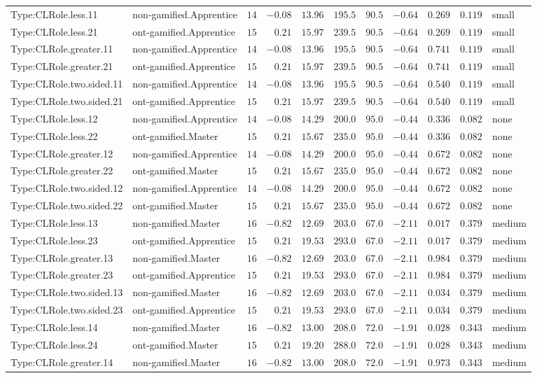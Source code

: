 \documentclass[6pt,a4paper]{article}
\begin{document}
{\begin{longtable}{llrrrrrrrrl}
Type:CLRole.less.11&non-gamified.Apprentice&$14$&$-0.08$&$13.96$&$ 195.5$&$ 90.5$&$-0.64$&$0.269$&$0.119$&small\tabularnewline
Type:CLRole.less.21&ont-gamified.Apprentice&$15$&$ 0.21$&$15.97$&$ 239.5$&$ 90.5$&$-0.64$&$0.269$&$0.119$&small\tabularnewline
Type:CLRole.greater.11&non-gamified.Apprentice&$14$&$-0.08$&$13.96$&$ 195.5$&$ 90.5$&$-0.64$&$0.741$&$0.119$&small\tabularnewline
Type:CLRole.greater.21&ont-gamified.Apprentice&$15$&$ 0.21$&$15.97$&$ 239.5$&$ 90.5$&$-0.64$&$0.741$&$0.119$&small\tabularnewline
Type:CLRole.two.sided.11&non-gamified.Apprentice&$14$&$-0.08$&$13.96$&$ 195.5$&$ 90.5$&$-0.64$&$0.540$&$0.119$&small\tabularnewline
Type:CLRole.two.sided.21&ont-gamified.Apprentice&$15$&$ 0.21$&$15.97$&$ 239.5$&$ 90.5$&$-0.64$&$0.540$&$0.119$&small\tabularnewline
Type:CLRole.less.12&non-gamified.Apprentice&$14$&$-0.08$&$14.29$&$ 200.0$&$ 95.0$&$-0.44$&$0.336$&$0.082$&none\tabularnewline
Type:CLRole.less.22&ont-gamified.Master&$15$&$ 0.21$&$15.67$&$ 235.0$&$ 95.0$&$-0.44$&$0.336$&$0.082$&none\tabularnewline
Type:CLRole.greater.12&non-gamified.Apprentice&$14$&$-0.08$&$14.29$&$ 200.0$&$ 95.0$&$-0.44$&$0.672$&$0.082$&none\tabularnewline
Type:CLRole.greater.22&ont-gamified.Master&$15$&$ 0.21$&$15.67$&$ 235.0$&$ 95.0$&$-0.44$&$0.672$&$0.082$&none\tabularnewline
Type:CLRole.two.sided.12&non-gamified.Apprentice&$14$&$-0.08$&$14.29$&$ 200.0$&$ 95.0$&$-0.44$&$0.672$&$0.082$&none\tabularnewline
Type:CLRole.two.sided.22&ont-gamified.Master&$15$&$ 0.21$&$15.67$&$ 235.0$&$ 95.0$&$-0.44$&$0.672$&$0.082$&none\tabularnewline
Type:CLRole.less.13&non-gamified.Master&$16$&$-0.82$&$12.69$&$ 203.0$&$ 67.0$&$-2.11$&$0.017$&$0.379$&medium\tabularnewline
Type:CLRole.less.23&ont-gamified.Apprentice&$15$&$ 0.21$&$19.53$&$ 293.0$&$ 67.0$&$-2.11$&$0.017$&$0.379$&medium\tabularnewline
Type:CLRole.greater.13&non-gamified.Master&$16$&$-0.82$&$12.69$&$ 203.0$&$ 67.0$&$-2.11$&$0.984$&$0.379$&medium\tabularnewline
Type:CLRole.greater.23&ont-gamified.Apprentice&$15$&$ 0.21$&$19.53$&$ 293.0$&$ 67.0$&$-2.11$&$0.984$&$0.379$&medium\tabularnewline
Type:CLRole.two.sided.13&non-gamified.Master&$16$&$-0.82$&$12.69$&$ 203.0$&$ 67.0$&$-2.11$&$0.034$&$0.379$&medium\tabularnewline
Type:CLRole.two.sided.23&ont-gamified.Apprentice&$15$&$ 0.21$&$19.53$&$ 293.0$&$ 67.0$&$-2.11$&$0.034$&$0.379$&medium\tabularnewline
Type:CLRole.less.14&non-gamified.Master&$16$&$-0.82$&$13.00$&$ 208.0$&$ 72.0$&$-1.91$&$0.028$&$0.343$&medium\tabularnewline
Type:CLRole.less.24&ont-gamified.Master&$15$&$ 0.21$&$19.20$&$ 288.0$&$ 72.0$&$-1.91$&$0.028$&$0.343$&medium\tabularnewline
Type:CLRole.greater.14&non-gamified.Master&$16$&$-0.82$&$13.00$&$ 208.0$&$ 72.0$&$-1.91$&$0.973$&$0.343$&medium\tabularnewline

\end{longtable}}
\end{document}
